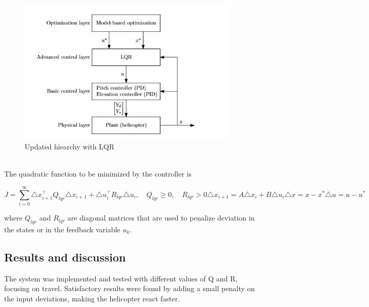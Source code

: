 \begin{figure}[H]
\includegraphics[width=1\linewidth, height=7cm]{figures/10_3ControlHieraky} 
\centering
\caption{Updated hiearchy with LQR}\label{fig:figur8}
\end{figure}\\

The quadratic function to be minimized by the controller is

\begin{subequations}\label{eq:10_3_linmod}
\begin{equation}\label{eq:10_3_objfunc}
J = \sum_{i=0}^{\infty} \triangle x_{i+1}^\top Q_{lqr} \triangle x_{i+1}+\triangle u_{i}^\top R_{lqr} \triangle u_{i},\quad Q_{lqr}\geq 0,\quad R_{lqr}>0
\end{equation}
\begin{equation}
\triangle x_{i+1} = A\triangle x_{i} + B\triangle u_{i} \end{equation}
\begin{equation}
\triangle x = x - x^*        
\end{equation}
\begin{equation}
\triangle u = u - u^*        
\end{equation}		
\end{subequations}

where $Q_{lqr}$ and $R_{lqr}$ are diagonal matrices that are used to penalize deviation in the states or in the feedback variable $u_{k}$.

\newpage
\subsection{Results and discussion}
The system was implemented and tested with different values of Q and R, focusing on travel. Satisfactory results were found by adding a small penalty on the input deviations, making the helicopter react faster. 

